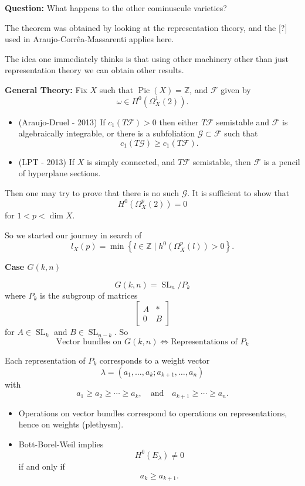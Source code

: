 \medskip\noindent
{\bf Question:}
What happens to the other cominuscule
varieties?



\medskip\noindent
The theorem was obtained by looking at the
representation theory, and the [?]
used in Araujo-Corrêa-Massarenti applies
here.

The idea one immediately thinks is that
using other machinery other than just
representation theory we can obtain other
results.

\medskip\noindent
{\bf General Theory:}
Fix $X$ such that
$\operatorname{Pic}(X)=\mathbb{Z}$, and
$\mathcal{F}$ given by
$$
\omega\in H^0(\Omega_X^1(2)).
$$

\begin{itemize}
\item (Araujo-Druel - 2013) If
$c_1(T\mathcal{F})>0$ then either
$T\mathcal{F}$ semistable and
$\mathcal{F}$ is algebraically integrable,
or there is a subfoliation
$\mathcal{G}\subset\mathcal{F}$ such that
$$
c_1(T\mathcal{G})
\geq c_1(T\mathcal{F}).
$$

\item (LPT - 2013) If $X$ is simply
connected, and $T\mathcal{F}$ semistable,
then $\mathcal{F}$ is a pencil of
hyperplane sections.
\end{itemize}

Then one may try to prove that there is no
such $\mathcal{G}$.
It is sufficient to show that
$$
H^0(\Omega_X^p(2))=0
$$
for $1<p<\dim X$.

So we started our journey in search of
$$
l_X(p)=
\min\left\{
l\in\mathbb{Z}
\mid
h^0(\Omega_X^p(l))>0
\right\}.
$$

\medskip\noindent
{\bf Case $G(k,n)$}

$$
G(k,n)=\operatorname{SL}_n/P_k
$$
where $P_k$ is the subgroup of matrices
$$
\begin{bmatrix}
A&*\\
0&B
\end{bmatrix}
$$
for $A\in\operatorname{SL}_k$ and
$B\in\operatorname{SL}_{n-k}$.
So
$$
\text{Vector bundles on }G(k,n)
\Longleftrightarrow
\text{Representations of }P_k
$$

Each representation of $P_k$ corresponds
to a weight vector
$$
\lambda=
(a_1,\ldots,a_k;
a_{k+1},\ldots,a_n)
$$
with
$$
a_1\geq a_2\geq\cdots\geq a_k,
\quad\text{and}\quad
a_{k+1}\geq\cdots\geq a_n.
$$

\begin{itemize}
\item Operations on vector bundles
correspond to operations on
representations, hence on weights
(plethysm).

\item Bott-Borel-Weil implies
$$
H^0(E_\lambda)\neq 0
$$
if and only if
$$
a_k\geq a_{k+1}.
$$
\end{itemize}

